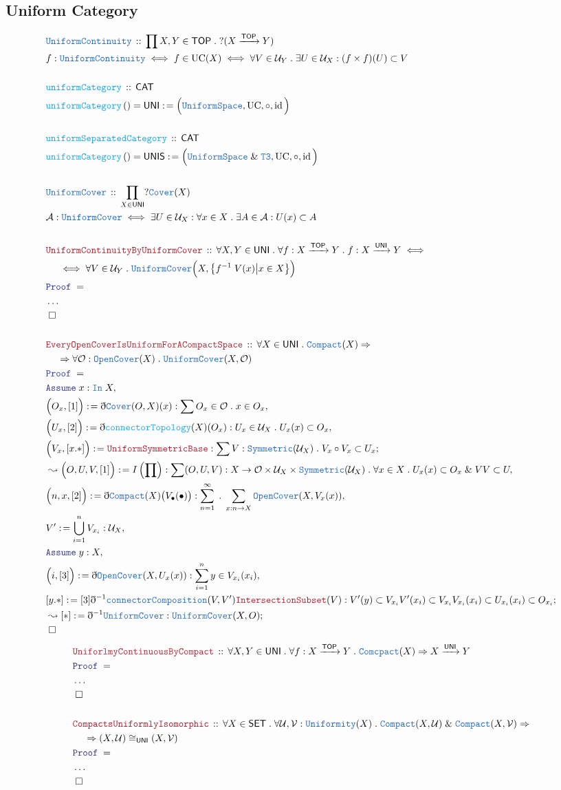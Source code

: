 \documentclass[12pt]{scrartcl}
\newcommand{\TYPE}[1]{\textcolor{NavyBlue}{\mathtt{#1}}}
\newcommand{\FUNC}[1]{\textcolor{Cerulean}{\mathtt{#1}}}
\newcommand{\LOGIC}[1]{\textcolor{Blue}{\mathtt{#1}}}
\newcommand{\THM}[1]{\textcolor{Maroon}{\mathtt{#1}}}
\renewcommand{\.}{\; . \;}
\newcommand{\de}{: \kern 0.1pc =}
\newcommand{\Act}[1]{\left( #1 \right)}
\newcommand{\Theorem}[2]{& \THM{#1} \, :: \, #2 \\ & \Proof = \\ }
\newcommand{\DeclareType}[2]{& \TYPE{#1} \, :: \, #2 \\}
\newcommand{\DefineType}[3]{& #1 : \TYPE{#2} \iff #3 \\}
\newcommand{\DefineNamedType}[4]{& #1 : \TYPE{#2} \iff #3 \iff #4 \\}
\newcommand{\DeclareFunc}[2]{& \FUNC{#1} \, :: \, #2 \\}
\newcommand{\DefineNamedFunc}[4]{&  \FUNC{#1}\Act{#2} = #3 \de #4 \\}
\newcommand{\NewLine}{\\ & \kern 1pc}
\newcommand{\Page}[1]{ \begin{align*} #1 \end{align*}   }
\newcommand{ \bd }{ \ByDef }
\newcommand{\NoProof}{ & \ldots \\ \EndProof}
\renewcommand{\And}{\; \& \;}
\newcommand{\Imply}{\Rightarrow}
\DeclareMathOperator*{\id}{id}
\newcommand{\Arrow}{\xrightarrow}
\newcommand{\Say}[3]{& #1 \de #2 : #3, \\}
\newcommand{\Conclude}[3]{& #1 \de #2 : #3; \\}
\newcommand{\Derive}[3]{& \leadsto #1 \de #2 : #3, \\}
\newcommand{\DeriveConclude}[3]{& \leadsto #1 \de #2 : #3 ; \\}
\newcommand{\Assume}[2]{& \LOGIC{Assume} \; #1 : #2, \\}
\newcommand{\QED}{\; \square}
\newcommand{\EndProof}{& \QED \\}
\newcommand{\ByDef}{\eth}
\newcommand{\Proof}{\LOGIC{Proof} \; }
\newcommand{\A}{\mathcal{A}}
\newcommand{\CAT}{\mathsf{CAT}}
\newcommand{\SET}{\mathsf{SET}}
\newcommand{\TOP}{\mathsf{TOP}}
\newcommand{\U}{\mathcal{U}}
\newcommand{\UNI}{\mathsf{UNI}}
\newcommand{\UNIS}{\mathsf{UNIS}}
\begin{document}
\subsection{Uniform Category} 
\Page{
	\DeclareType{UniformContinuity}{\prod X,Y \in \TOP \.  ?(X \Arrow{\TOP} Y)}
	\DefineNamedType{f}{UniformContinuity}{f \in \mathrm{UC}(X)}{\forall V \in \U_Y \. \exists U \in \U_X :  (f\times f)(U) \subset V}
	\\
	\DeclareFunc{uniformCategory}{\CAT}
	\DefineNamedFunc{uniformCategory}{}{\UNI}{\Big( \TYPE{UniformSpace} , \mathrm{UC}, \circ, \id  \Big)}
	\\
	\DeclareFunc{uniformSeparatedCategory}{\CAT}
	\DefineNamedFunc{uniformCategory}{}{\UNIS}{\Big( \TYPE{UniformSpace} \And \TYPE{T3} , \mathrm{UC}, \circ, \id  \Big)}
	\\
	\DeclareType{UniformCover}{\prod_{X \in \UNI} ?\TYPE{Cover}(X)}
	\DefineType{\A}{UniformCover}{\exists U \in \U_X : \forall  x \in X \. \exists A \in \A  : U(x) \subset A }
	\\
	\Theorem{UniformContinuityByUniformCover}{
		\forall X,Y \in \UNI \. 
		\forall f : X \Arrow{\TOP} Y \. 
		f : X \Arrow{\UNI} Y \iff \NewLine \iff \forall V \in \U_Y \. 
		\TYPE{UniformCover}\Big( X, \big\{ f^{-1}\; V(x)  \big| x \in X \big\} \Big) 
	}
	\NoProof
	\\
	\Theorem{EveryOpenCoverIsUniformForACompactSpace}{
		\forall X \in \UNI \. 
		\TYPE{Compact}(X) \Imply \NewLine \Imply
		\forall \mathcal{O} : \TYPE{OpenCover}(X) \.
		\TYPE{UniformCover}(X,\mathcal{O})
	}
	\Assume{x}{\TYPE{In}\;X}
	\Say{\Big( O_x, [1] \Big)}{\bd \TYPE{Cover}(O,X)(x)}{\sum O_x \in \mathcal{O} \. x \in O_x}
	\Say{\Big(U_x,[2]\Big)}{\bd \FUNC{connectorTopology}(X)(O_x)}{U_x \in \U_X\.  U_x(x) \subset O_x}
	\Conclude{\Big( V_x,[x.*] \Big)}{\THM{UniformSymmetricBase}}{\sum V : \TYPE{Symmetric}(\U_X) \. V_x \circ V_x \subset U_x}
	\Derive{\Big(O,U,V,[1]\Big)}{I\Act{\prod}}{ \sum  (O,U,V) : X \to \mathcal{O}\times \U_X \times \TYPE{Symmetric}(\U_X) \. \forall x \in X \.   U_x(x) \subset O_x \And VV \subset U }
	\Say{\Big(n ,x,[2] \Big)}{\bd \TYPE{Compact}(X)\big(V_{\bullet}(\bullet)\big)}{\sum_{n=1}^\infty\. \sum_{x : n \to X} \TYPE{OpenCover}(X,V_x(x))  }
	\Say{V'}{\bigcup^n_{i=1} V_{x_i}}{\U_X }
	\Assume{y}{X}
	\Say{\Big(i,[3]\Big)}{\bd \TYPE{OpenCover}(X,U_x(x))}{\sum_{i=1}^n y \in  V_{x_i}(x_i)}
	\Conclude{[y.*]}{[3]\bd^{-1}\TYPE{connectorComposition}(V,V')\THM{IntersectionSubset}(V)}{V'(y) \subset V_{x_i}V'(x_i) \subset V_{x_i}V_{x_i}(x_i) \subset U_{x_i}(x_i) \subset O_{x_i}}
	\DeriveConclude{[*]}{\bd^{-1}\TYPE{UniformCover}}{\TYPE{UniformCover}(X,O)}
	\EndProof
}
\Page{
\Theorem{UniforlmyContinuousByCompact}{\forall X,Y \in \UNI \. \forall f : X \Arrow{\TOP} Y \.  \TYPE{Comcpact}(X) \Imply X \Arrow{\UNI} Y}
\NoProof
\\
\Theorem{CompactsUniformlyIsomorphic}{\forall X \in \SET \. \forall \U,\mathcal{V} : \TYPE{Uniformity}(X) \. \TYPE{Compact}(X,\U) \And \TYPE{Compact}(X,\mathcal{V}) \Imply \NewLine \Imply (X,\U) \cong_{\UNI} (X,\mathcal{V})}
\NoProof
}
\newpage
\end{document}
